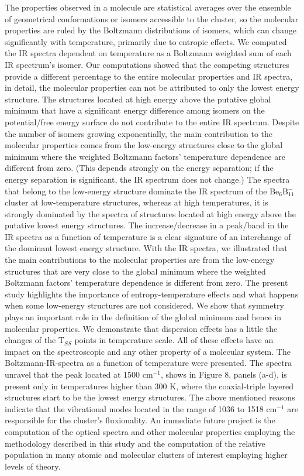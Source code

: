 \documentclass[prb,aps,preprint,showkeys,showpacs]{revtex4}
\begin{document}
The properties observed in a molecule are statistical averages over the ensemble of geometrical conformations or isomers accessible to the cluster, so the molecular properties are ruled by the Boltzmann distributions of isomers, which can change significantly with temperature, primarily due to entropic effects. We computed the IR spectra dependent on temperature as a Boltzmann weighted sum of each IR spectrum’s isomer. Our computations showed that the competing structures provide a different percentage to the entire molecular properties and IR spectra, in detail, the molecular properties can not be attributed to only the lowest energy structure. The structures located at high energy above the putative global minimum that have a significant energy difference among isomers on the potential/free energy surface do not contribute to the entire IR spectrum. Despite the number of isomers growing exponentially, the main contribution to the molecular properties comes from the low-energy structures close to the global minimum where the weighted Boltzmann factors’ temperature dependence are different from zero. (This depends strongly on the energy separation; if the energy separation is significant, the IR spectrum does not change.) The spectra that belong to the low-energy structure dominate the IR spectrum of the  Be$_6$B$^{-}_{11}$ cluster at low-temperature structures, whereas at high temperatures, it is strongly dominated by the spectra of structures located at high energy above the putative lowest energy structures. The increase/decrease in a peak/band in the IR spectra as a function of temperature is a clear signature of an interchange of the dominant lowest energy structure. With the IR spectra, we illustrated that the main contributions to the molecular properties are from the low-energy structures that are very close to the global minimum where the weighted Boltzmann factors’ temperature dependence is different from zero. 
The present study highlights the importance of entropy-temperature effects and what happens when some low-energy structures are not considered. We show that symmetry plays an important role in the definition of the global minimum and hence in molecular properties. We demonstrate that dispersion effects has a little the changes of the T$_{SS}$ points in temperature scale.  All of these effects have an impact on the spectroscopic and any other property of a molecular system. The Boltzmann-IR-spectra as a function of temperature were presented. The spectra unravel that the peak located at 1500 cm$^{-1}$, shows in Figure 8, panels (a-d), is present only in temperatures higher than  300 K,  where the coaxial-triple layered structures start to be the lowest energy structures.  The above mentioned reasons indicate that the vibrational modes located in the range of 1036 to 1518 cm$^{-1}$ are responsible for the cluster's fluxionality.  
An immediate future project is the computation of the optical spectra and other molecular properties employing the methodology described in this study and the computation of the relative population in many atomic and molecular clusters of interest employing higher levels of theory.
\end{document}

